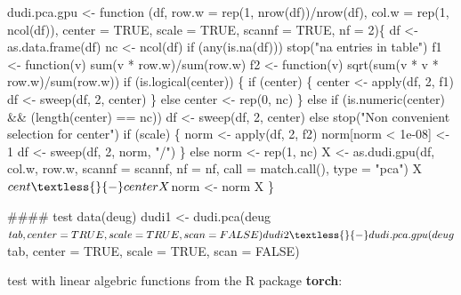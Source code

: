 \documentclass[
  10pt,
]{article}
\newenvironment{Shaded}{\begin{snugshade}}{\end{snugshade}}
\newcommand{\NormalTok}[1]{#1}
\begin{document}
\begin{Shaded}
\begin{Highlighting}[]
\NormalTok{dudi.pca.gpu \textless{}{-} function (df, row.w = rep(1, nrow(df))/nrow(df), col.w = rep(1, }
\NormalTok{    ncol(df)), center = TRUE, scale = TRUE, scannf = TRUE, nf = 2)\{}
\NormalTok{    df \textless{}{-} as.data.frame(df)}
\NormalTok{    nc \textless{}{-} ncol(df)}
\NormalTok{    if (any(is.na(df))) }
\NormalTok{        stop("na entries in table")}
\NormalTok{    f1 \textless{}{-} function(v) sum(v * row.w)/sum(row.w)}
\NormalTok{    f2 \textless{}{-} function(v) sqrt(sum(v * v * row.w)/sum(row.w))}
\NormalTok{    if (is.logical(center)) \{}
\NormalTok{        if (center) \{}
\NormalTok{            center \textless{}{-} apply(df, 2, f1)}
\NormalTok{            df \textless{}{-} sweep(df, 2, center)}
\NormalTok{        \}}
\NormalTok{        else center \textless{}{-} rep(0, nc)}
\NormalTok{    \}}
\NormalTok{    else if (is.numeric(center) \&\& (length(center) == nc)) }
\NormalTok{        df \textless{}{-} sweep(df, 2, center)}
\NormalTok{    else stop("Non convenient selection for center")}
\NormalTok{    if (scale) \{}
\NormalTok{        norm \textless{}{-} apply(df, 2, f2)}
\NormalTok{        norm[norm \textless{} 1e{-}08] \textless{}{-} 1}
\NormalTok{        df \textless{}{-} sweep(df, 2, norm, "/")}
\NormalTok{    \}}
\NormalTok{    else norm \textless{}{-} rep(1, nc)}
\NormalTok{    X \textless{}{-} as.dudi.gpu(df, col.w, row.w, scannf = scannf, nf = nf, }
\NormalTok{        call = match.call(), type = "pca")}
\NormalTok{    X$cent \textless{}{-} center}
\NormalTok{    X$norm \textless{}{-} norm}
\NormalTok{    X}
\NormalTok{\}}


\NormalTok{\#\#\#\# test}
\NormalTok{data(deug)}
\NormalTok{dudi1 \textless{}{-} dudi.pca(deug$tab, center = TRUE, scale = TRUE, scan = FALSE)}
\NormalTok{dudi2 \textless{}{-} dudi.pca.gpu(deug$tab, center = TRUE, scale = TRUE, scan = FALSE)}
\end{Highlighting}
\end{Shaded}

test with linear algebric functions from the R package \textbf{torch}:
\end{document}
